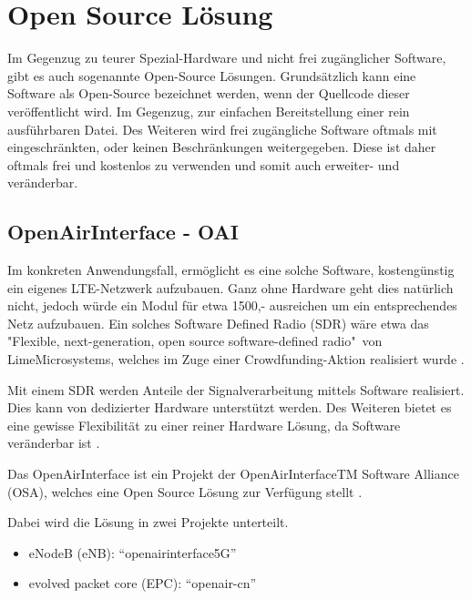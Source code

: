 
%
%
% 
% 
% 

\section{Open Source Lösung}
\label{sec:open_source}

Im Gegenzug zu teurer Spezial-Hardware und nicht frei zugänglicher Software, gibt es auch sogenannte Open-Source Lösungen. Grundsätzlich kann eine Software als Open-Source bezeichnet werden, wenn der Quellcode dieser veröffentlicht wird. Im Gegenzug, zur einfachen Bereitstellung einer rein ausführbaren Datei.
Des Weiteren wird frei zugängliche Software oftmals mit eingeschränkten, oder keinen Beschränkungen weitergegeben. Diese ist daher oftmals frei und kostenlos zu verwenden und somit auch erweiter- und veränderbar. \cite{gacek2004many}

\subsection{OpenAirInterface - OAI}
Im konkreten Anwendungsfall, ermöglicht es eine solche Software, kostengünstig ein eigenes LTE-Netzwerk aufzubauen. 
Ganz ohne Hardware geht dies natürlich nicht, jedoch würde ein Modul für etwa 1500,- ausreichen um ein entsprechendes Netz aufzubauen. Ein solches Software Defined Radio (SDR) wäre etwa das "Flexible, next-generation, open source software-defined radio"\ von LimeMicrosystems, welches im Zuge einer Crowdfunding-Aktion realisiert wurde \cite{CroudLime01}. 

Mit einem SDR werden Anteile der Signalverarbeitung mittels Software realisiert. Dies kann von dedizierter Hardware unterstützt werden. Des Weiteren bietet es eine gewisse Flexibilität zu einer reiner Hardware Lösung, da Software veränderbar ist \cite{jondral2005software}. 

Das OpenAirInterface ist ein Projekt der OpenAirInterfaceTM Software Alliance (OSA), welches eine Open Source Lösung zur Verfügung stellt \cite{OpenAir19}.

Dabei wird die Lösung in zwei Projekte unterteilt. 
\begin{itemize}
	\item eNodeB (eNB): “openairinterface5G”
	\item evolved packet core (EPC): “openair-cn”
\end{itemize}

